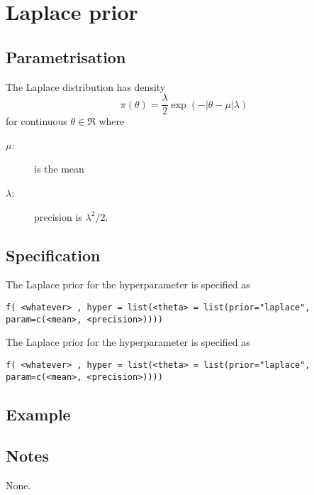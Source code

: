 \documentclass[a4paper,11pt]{article}
\begin{document}
\section*{Laplace prior}

\subsection*{Parametrisation}
The Laplace distribution has density
\begin{equation}
    \pi(\theta)= \frac{\lambda}{2} \exp(-|\theta-\mu| \lambda)
\end{equation}
for continuous $\theta\in\Re$ where
\begin{description}
\item[$\mu$:] is the mean
\item[$\lambda$:] precision is $\lambda^{2}/2$.
\end{description}

\subsection*{Specification}
The Laplace prior for the hyperparameter is specified as
\begin{center}
    \texttt{f( <whatever> , hyper = list(<theta> = list(prior="laplace", param=c(<mean>, <precision>))))}
\end{center}

The Laplace prior for the hyperparameter is specified as
\begin{center}
    \texttt{f( <whatever> , hyper = list(<theta> = list(prior="laplace", param=c(<mean>, <precision>))))}
\end{center}

\subsection*{Example}

\subsection*{Notes}

None.
\end{document}
